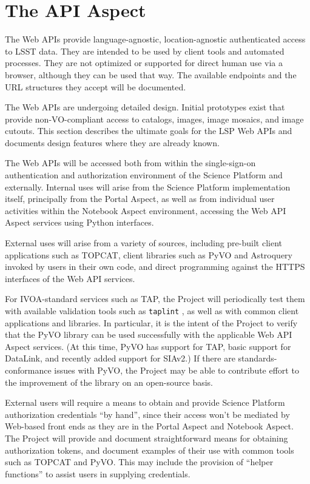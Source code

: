 \section{The API Aspect}\label{api-aspect}

The Web APIs provide language-agnostic, location-agnostic authenticated access
to LSST data.  They are intended to be used by client tools and automated
processes.  They are not optimized or supported for direct human use via a
browser, although they can be used that way.  The available endpoints and the
URL structures they accept will be documented.

The Web APIs are undergoing detailed design.  Initial prototypes exist that
provide non-VO-compliant access to catalogs, images, image mosaics, and image
cutouts.  This section describes the ultimate goals for the LSP Web APIs and
documents design features where they are already known.

The Web APIs will be accessed both from within the single-sign-on authentication
and authorization environment of the Science Platform and externally.
Internal uses will arise from the Science Platform implementation itself,
principally from the Portal Aspect, as well as from individual user activities
within the Notebook Aspect environment, accessing the Web API Aspect services
using Python interfaces.

External uses will arise from a variety of sources, including pre-built client
applications such as TOPCAT, client libraries such as PyVO and Astroquery
invoked by users in their own code, and direct programming against the
HTTPS interfaces of the Web API services.

For IVOA-standard services such as TAP, the Project will periodically test them
with available validation tools such as \texttt{taplint} \citep{TaplintLink2006ASPC..351..666T}, 
as well as with common client applications and libraries.
In particular, it is the intent of the Project to verify that the PyVO library
can be used successfully with the applicable Web API Aspect services.
(At this time, PyVO has support for TAP, basic support for DataLink, and
recently added support for SIAv2.)
If there are standards-conformance issues with PyVO, the Project may be able
to contribute effort to the improvement of the library on an open-source basis.

External users will require a means to obtain and provide Science Platform
authorization credentials ``by hand'', since their access won't be mediated by
Web-based front ends as they are in the Portal Aspect and Notebook Aspect.
The Project will provide and document straightforward means for obtaining
authorization tokens, and document examples of their use with common tools
such as TOPCAT and PyVO.
This may include the provision of ``helper functions'' to assist users in
supplying credentials.

